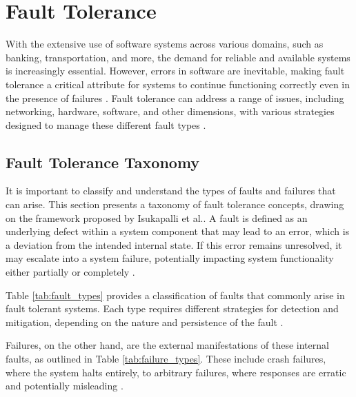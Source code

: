     

\section{Fault Tolerance}

With the extensive use of software systems across various domains, such as banking, transportation, and more, the demand for reliable and available systems is increasingly essential. However, errors in software are inevitable, making fault tolerance a critical attribute for systems to continue functioning correctly even in the presence of failures \cite{Sari2015}. Fault tolerance can address a range of issues, including networking, hardware, software, and other dimensions, with various strategies designed to manage these different fault types \cite{Sharma2016,Noor2019}.

\subsection{Fault Tolerance Taxonomy}

It is important to classify and understand the types of faults and failures that can arise. This section presents a taxonomy of fault tolerance concepts, drawing on the framework proposed by Isukapalli et al.\cite{Isukapalli2024}. A fault is defined as an underlying defect within a system component that may lead to an error, which is a deviation from the intended internal state. If this error remains unresolved, it may escalate into a system failure, potentially impacting system functionality either partially or completely \cite{Isukapalli2024,Reghenzani2023}. 

Table \ref{tab:fault_types} provides a classification of faults that commonly arise in fault tolerant systems. Each type requires different strategies for detection and mitigation, depending on the nature and persistence of the fault \cite{Isukapalli2024,Tanenbaum2023}.

Failures, on the other hand, are the external manifestations of these internal faults, as outlined in Table \ref{tab:failure_types}. These include crash failures, where the system halts entirely, to arbitrary failures, where responses are erratic and potentially misleading \cite{Tanenbaum2023,Haider2011}.


